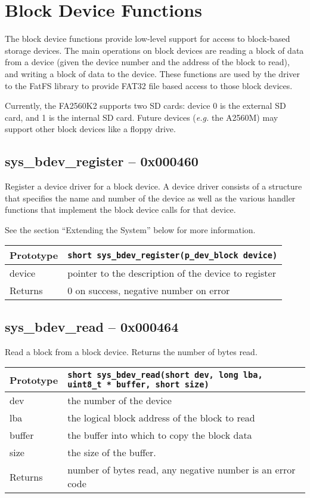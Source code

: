 \section{Block Device Functions}
The block device functions provide low-level support for access to block-based storage devices. The main operations on block devices are reading a block of data from a device (given the device number and the address of the block to read), and writing a block of data to the device. These functions are used by the driver to the FatFS library to provide FAT32 file based access to those block devices.

Currently, the FA2560K2 supports two SD cards: device 0 is the external SD card, and 1 is the internal SD card. Future devices ({\it e.g.} the A2560M) may support other block devices like a floppy drive.

\subsection*{sys\_bdev\_register -- 0x000460}
Register a device driver for a block device. A device driver consists of a structure that specifies the name and number of the device as well as the various handler functions that implement the block device calls for that device.

See the section ``Extending the System'' below for more information.

\bigskip

\begin{tabular}{|l||l|} \hline
Prototype & \lstinline!short sys_bdev_register(p_dev_block device)! \\ \hline
device & pointer to the description of the device to register \\ \hline
Returns & 0 on success, negative number on error \\ \hline
\end{tabular}

\subsection*{sys\_bdev\_read -- 0x000464}
Read a block from a block device. Returns the number of bytes read.

\bigskip

\begin{tabular}{|l||l|} \hline
Prototype & \lstinline!short sys_bdev_read(short dev, long lba, uint8_t * buffer, short size)! \\ \hline
dev & the number of the device \\ \hline
lba & the logical block address of the block to read \\ \hline
buffer & the buffer into which to copy the block data \\ \hline
size & the size of the buffer. \\ \hline
Returns & number of bytes read, any negative number is an error code \\ \hline
\end{tabular}

